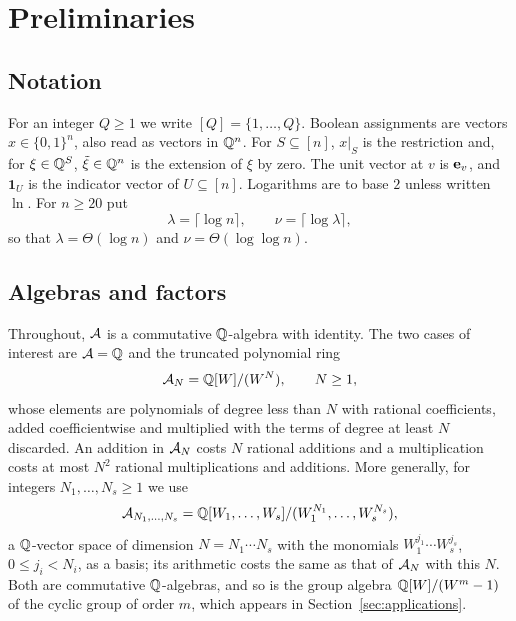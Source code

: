 \section{Preliminaries}\label{sec:prelim}

\subsection{Notation}
For an integer $Q\ge1$ we write $[Q]=\{1,\dots,Q\}$. Boolean assignments are
vectors $x\in\{0,1\}^n$, also read as vectors in $\mathbb{Q}^n$. For $S\subseteq[n]$,
$x|_S$ is the restriction and, for $\xi\in\mathbb{Q}^S$, $\tilde\xi\in\mathbb{Q}^n$ is the
extension of $\xi$ by zero. The unit vector at $v$ is $\mathbf{e}_v$, and $\mathbf 1_U$ is
the indicator vector of $U\subseteq[n]$. Logarithms are to base $2$ unless
written $\ln$. For $n\ge 20$ put
\begin{equation}\label{eq:lambda}
  \lambda=\lceil\log n\rceil,\qquad \nu=\lceil\log\lambda\rceil,
\end{equation}
so that $\lambda=\Theta(\log n)$ and $\nu=\Theta(\log\log n)$.

\subsection{Algebras and factors}
Throughout, $\mathcal{A}$ is a commutative $\mathbb{Q}$-algebra with identity. The two cases of
interest are $\mathcal{A}=\mathbb{Q}$ and the truncated polynomial ring
\begin{equation}\label{eq:AN}
  \mathcal{A}_N=\mathbb{Q}[W]/(W^{N}),\qquad N\ge1,
\end{equation}
whose elements are polynomials of degree less than $N$ with rational
coefficients, added coefficientwise and multiplied with the terms of degree at
least $N$ discarded. An addition in $\mathcal{A}_N$ costs $N$ rational additions and a
multiplication costs at most $N^2$ rational multiplications and additions. More
generally, for integers $N_1,\dots,N_s\ge1$ we use
\begin{equation}\label{eq:ANs}
  \mathcal{A}_{N_1,\dots,N_s}=\mathbb{Q}[W_1,\dots,W_s]/(W_1^{N_1},\dots,W_s^{N_s}),
\end{equation}
a $\mathbb{Q}$-vector space of dimension $N=N_1\cdots N_s$ with the monomials
$W_1^{j_1}\cdots W_s^{j_s}$, $0\le j_i<N_i$, as a basis; its arithmetic costs
the same as that of $\mathcal{A}_N$ with this $N$. Both are commutative $\mathbb{Q}$-algebras,
and so is the group algebra $\mathbb{Q}[W]/(W^{m}-1)$ of the cyclic group of order $m$,
which appears in Section~\ref{sec:applications}.

